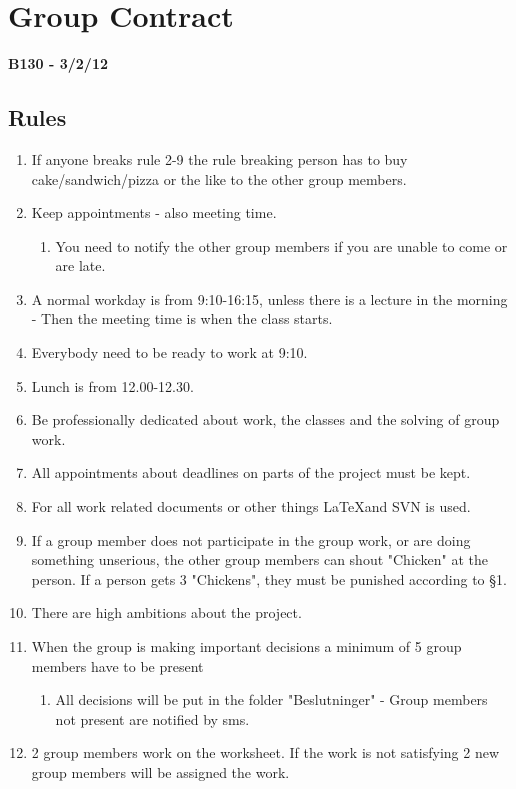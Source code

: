 \chapter{Group Contract}
\label{chap:groupcontract}
\textbf{B130 - 3/2/12}
\section*{Rules}
\renewcommand{\labelenumi}{§ \arabic{enumi}}
\renewcommand{\labelenumii}{\alph{enumii}}
\begin{enumerate}
\item If anyone breaks rule 2-9 the rule breaking person has to buy cake/sandwich/pizza or the like to the other group members.
\item Keep appointments - also meeting time. 
	\begin{enumerate}
	\item You need to notify the other group members if you are unable to come or are late.
	\end{enumerate}
\item A normal workday is from 9:10-16:15, unless there is a lecture in the morning - Then the meeting time is when the class starts.
\item Everybody need to be ready to work at 9:10.
\item Lunch is from 12.00-12.30.
\item Be professionally dedicated about work, the classes and the solving of group work.
\item All appointments about deadlines on parts of the project must be kept.
\item For all work related documents or other things \LaTeX and SVN is used.
\item If a group member does not participate in the group work, or are doing something unserious, the other group members can shout "Chicken" at the person. If a person gets 3 "Chickens", they must be punished according to §1.
\item There are high ambitions about the project.
\item When the group is making important decisions a minimum of 5 group members have to be present 
	\begin{enumerate}
	\item All decisions will be put in the folder "Beslutninger" - Group members not present are notified by sms.
	\end{enumerate}
\item 2 group members work on the worksheet.  If the work is not satisfying 2 new group members will be assigned the work.

\end{enumerate}
